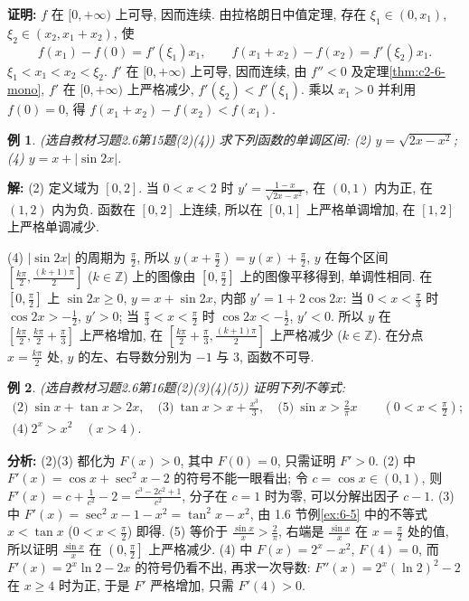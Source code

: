 \documentclass[UTF8,openany]{ctexbook}
\theoremstyle{chinesetextbook}
\newtheorem{example}{例}[section]
\newenvironment{cnproof}{\par\indent\textbf{证明:} \ignorespaces}{\par}
\newenvironment{cnsolution}{\par\indent\textbf{解:} \ignorespaces}{\par}
\begin{document}
\begin{cnproof}
$f$ 在 $[0,+\infty)$ 上可导, 因而连续. 由拉格朗日中值定理, 存在 $\xi_1\in(0,x_1)$, $\xi_2\in(x_2,x_1+x_2)$, 使
\[
f(x_1)-f(0)=f'(\xi_1)x_1,\qquad f(x_1+x_2)-f(x_2)=f'(\xi_2)x_1.
\]
$\xi_1<x_1<x_2<\xi_2$. $f'$ 在 $[0,+\infty)$ 上可导, 因而连续, 由 $f''<0$ 及定理\ref{thm:c2-6-mono}, $f'$ 在 $[0,+\infty)$ 上严格减少, $f'(\xi_2)<f'(\xi_1)$. 乘以 $x_1>0$ 并利用 $f(0)=0$, 得 $f(x_1+x_2)-f(x_2)<f(x_1)$.
\end{cnproof}
\begin{example}\label{ex:c2-h6-15}
\textnormal{(选自教材习题2.6第15题(2)(4))} 求下列函数的单调区间: (2) $y=\sqrt{2x-x^2}$; (4) $y=x+\lvert\sin2x\rvert$.
\end{example}
\begin{cnsolution}
(2) 定义域为 $[0,2]$. 当 $0<x<2$ 时 $\displaystyle y'=\frac{1-x}{\sqrt{2x-x^2}}$, 在 $(0,1)$ 内为正, 在 $(1,2)$ 内为负. 函数在 $[0,2]$ 上连续, 所以在 $[0,1]$ 上严格单调增加, 在 $[1,2]$ 上严格单调减少.

(4) $\lvert\sin2x\rvert$ 的周期为 $\displaystyle\frac\pi2$, 所以 $\displaystyle y\left(x+\frac\pi2\right)=y(x)+\frac\pi2$, $y$ 在每个区间 $\displaystyle\left[\frac{k\pi}2,\frac{(k+1)\pi}2\right]$ ($k\in\mathbb Z$) 上的图像由 $\displaystyle\left[0,\frac\pi2\right]$ 上的图像平移得到, 单调性相同. 在 $\displaystyle\left[0,\frac\pi2\right]$ 上 $\sin2x\ge0$, $y=x+\sin2x$, 内部 $y'=1+2\cos2x$: 当 $\displaystyle0<x<\frac\pi3$ 时 $\displaystyle\cos2x>-\frac12$, $y'>0$; 当 $\displaystyle\frac\pi3<x<\frac\pi2$ 时 $\displaystyle\cos2x<-\frac12$, $y'<0$. 所以 $y$ 在 $\displaystyle\left[\frac{k\pi}2,\frac{k\pi}2+\frac\pi3\right]$ 上严格增加, 在 $\displaystyle\left[\frac{k\pi}2+\frac\pi3,\frac{(k+1)\pi}2\right]$ 上严格减少 ($k\in\mathbb Z$). 在分点 $\displaystyle x=\frac{k\pi}2$ 处, $y$ 的左、右导数分别为 $-1$ 与 $3$, 函数不可导.
\end{cnsolution}
\begin{example}\label{ex:c2-h6-16}
\textnormal{(选自教材习题2.6第16题(2)(3)(4)(5))} 证明下列不等式:
\[
\begin{gathered}
\text{(2)}\ \sin x+\tan x>2x,\quad\text{(3)}\ \tan x>x+\frac{x^3}3,\quad\text{(5)}\ \sin x>\frac2\pi x\qquad\left(0<x<\frac\pi2\right);\\
\text{(4)}\ 2^x>x^2\quad(x>4).
\end{gathered}
\]
\end{example}
\par\indent\textbf{分析:} (2)(3) 都化为 $F(x)>0$, 其中 $F(0)=0$, 只需证明 $F'>0$. (2) 中 $F'(x)=\cos x+\sec^2x-2$ 的符号不能一眼看出; 令 $c=\cos x\in(0,1)$, 则 $\displaystyle F'(x)=c+\frac1{c^2}-2=\frac{c^3-2c^2+1}{c^2}$, 分子在 $c=1$ 时为零, 可以分解出因子 $c-1$. (3) 中 $F'(x)=\sec^2x-1-x^2=\tan^2x-x^2$, 由 1.6 节例\ref{ex:6-5} 中的不等式 $x<\tan x$ ($\displaystyle0<x<\frac\pi2$) 即得. (5) 等价于 $\displaystyle\frac{\sin x}x>\frac2\pi$, 右端是 $\displaystyle\frac{\sin x}x$ 在 $\displaystyle x=\frac\pi2$ 处的值, 所以证明 $\displaystyle\frac{\sin x}x$ 在 $\displaystyle\left(0,\frac\pi2\right]$ 上严格减少. (4) 中 $F(x)=2^x-x^2$, $F(4)=0$, 而 $F'(x)=2^x\ln2-2x$ 的符号仍看不出, 再求一次导数: $F''(x)=2^x(\ln2)^2-2$ 在 $x\ge4$ 时为正, 于是 $F'$ 严格增加, 只需 $F'(4)>0$.
\end{document}
